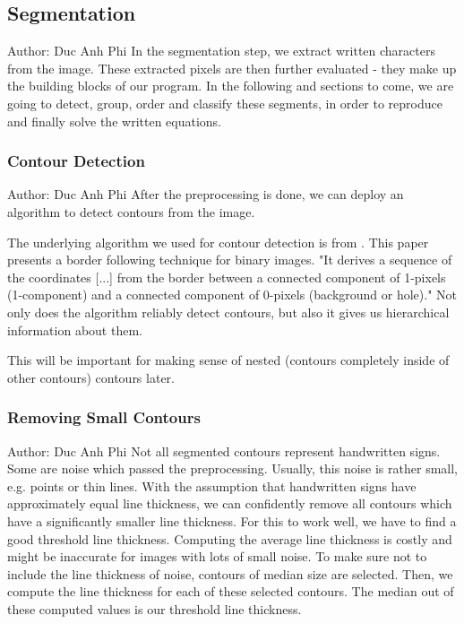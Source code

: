 \documentclass[11pt]{article}
\begin{document}
	
	
	
	\subsection{Segmentation}
		\small{Author: Duc Anh Phi} \newline \newline
	In the segmentation step, we extract written characters from the image.
	These extracted pixels are then further evaluated - they make up the building blocks of our program.
	In the following and sections to come, we are going to detect, group, order and classify these segments, in order to
	reproduce and finally solve the written equations.
	
	\subsubsection{Contour Detection}
	\small{Author: Duc Anh Phi} \newline \newline
	After the preprocessing is done, we can deploy an algorithm to detect contours from the image.
	
	The underlying algorithm we used for contour detection is from \cite{suzuki1985}.
	This paper presents a border following technique for binary images. "It derives a sequence of the coordinates [...]
	from the border between a connected component of 1-pixels (1-component) and a connected component of 0-pixels (background or hole)."
	Not only does the algorithm reliably detect contours, but also it gives us hierarchical information about them.
	
	This will be important for making sense of nested (contours completely inside of other contours) contours later.
	
	\subsubsection{Removing Small Contours}
	\small{Author: Duc Anh Phi} \newline \newline
	Not all segmented contours represent handwritten signs.
	Some are noise which passed the preprocessing. Usually, this noise is rather small, e.g. points or thin lines.
	With the assumption that handwritten signs have approximately equal line thickness, we can confidently remove all contours which have a significantly smaller line thickness.
	For this to work well, we have to find a good threshold line thickness.
	Computing the average line thickness is costly and might be inaccurate for images with lots of small noise.
	To make sure not to include the line thickness of noise, contours of median size are selected. Then, we compute the line thickness for each of these selected contours.
	The median out of these computed values is our threshold line thickness.
	
\end{document}
